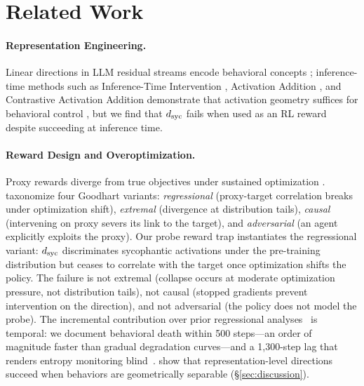 \section{Related Work}\label{sec:related_work}

\paragraph{Representation Engineering.}
Linear directions in LLM residual streams encode behavioral concepts \citep{zou2023repe, marks2024geometry}; inference-time methods such as Inference-Time Intervention \citep[ITI;][]{li2023iti}, Activation Addition \citep[ActAdd;][]{turner2023actadd}, and Contrastive Activation Addition \citep[CAA;][]{rimsky2024caa} demonstrate that activation geometry suffices for behavioral control \citep{burns2023ccs}, but we find that $d_{\text{syc}}$ fails when used as an RL reward despite succeeding at inference time.

\paragraph{Reward Design and Overoptimization.}
Proxy rewards diverge from true objectives under sustained optimization \citep{gao2023scaling, pan2022effects}.
\citet{manheim2019goodhart} taxonomize four Goodhart variants: \emph{regressional} (proxy-target correlation breaks under optimization shift), \emph{extremal} (divergence at distribution tails), \emph{causal} (intervening on proxy severs its link to the target), and \emph{adversarial} (an agent explicitly exploits the proxy).
Our probe reward trap instantiates the regressional variant: $d_{\text{syc}}$ discriminates sycophantic activations under the pre-training distribution but ceases to correlate with the target once optimization shifts the policy.
The failure is not extremal (collapse occurs at moderate optimization pressure, not distribution tails), not causal (stopped gradients prevent intervention on the direction), and not adversarial (the policy does not model the probe).
The incremental contribution over prior regressional analyses~\citep{gao2023scaling} is temporal: we document behavioral death within 500 steps---an order of magnitude faster than gradual degradation curves---and a 1{,}300-step lag that renders entropy monitoring blind~\citep{skalse2022hacking}.
\citet{wu2026rewardhacking} show that representation-level directions succeed when behaviors are geometrically separable (\S\ref{sec:discussion}).

